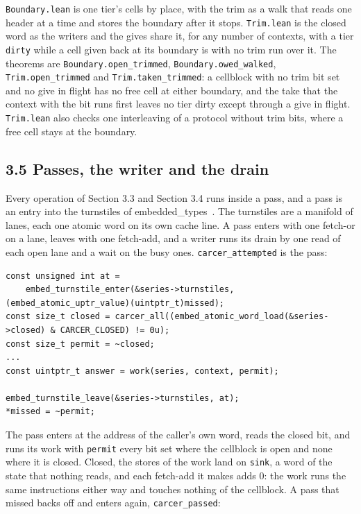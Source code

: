 \texttt{Boundary.\allowbreak{}lean} is one tier's cells by place, with the trim as a walk that reads one header at a time and stores the boundary after it stops. \texttt{Trim.\allowbreak{}lean} is the closed word as the writers and the gives share it, for any number of contexts, with a tier \texttt{dirty} while a cell given back at its boundary is with no trim run over it. The theorems are \texttt{Boundary.\allowbreak{}open\_\allowbreak{}trimmed}, \texttt{Boundary.\allowbreak{}owed\_\allowbreak{}walked}, \texttt{Trim.\allowbreak{}open\_\allowbreak{}trimmed} and \texttt{Trim.\allowbreak{}taken\_\allowbreak{}trimmed}: a cellblock with no trim bit set and no give in flight has no free cell at either boundary, and the take that the context with the bit runs first leaves no tier dirty except through a give in flight. \texttt{Trim.\allowbreak{}lean} also checks one interleaving of a protocol without trim bits, where a free cell stays at the boundary.

\subsection{\texorpdfstring{3.5 Passes, the writer and the drain}{3.5 Passes, the writer and the drain}}

Every operation of Section 3.3 and Section 3.4 runs inside a pass, and a pass is an entry into the turnstiles of embedded\_\allowbreak{}types~\cite{src:Turnstile}. The turnstiles are a manifold of lanes, each one atomic word on its own cache line. A pass enters with one fetch-or on a lane, leaves with one fetch-add, and a writer runs its drain by one read of each open lane and a wait on the busy ones. \texttt{carcer\_\allowbreak{}attempted} is the pass:

\begin{Verbatim}
const unsigned int at =
    embed_turnstile_enter(&series->turnstiles, (embed_atomic_uptr_value)(uintptr_t)missed);
const size_t closed = carcer_all((embed_atomic_word_load(&series->closed) & CARCER_CLOSED) != 0u);
const size_t permit = ~closed;
...
const uintptr_t answer = work(series, context, permit);

embed_turnstile_leave(&series->turnstiles, at);
*missed = ~permit;
\end{Verbatim}

The pass enters at the address of the caller's own word, reads the closed bit, and runs its work with \texttt{permit} every bit set where the cellblock is open and none where it is closed. Closed, the stores of the work land on \texttt{sink}, a word of the state that nothing reads, and each fetch-add it makes adds 0: the work runs the same instructions either way and touches nothing of the cellblock. A pass that missed backs off and enters again, \texttt{carcer\_\allowbreak{}passed}:

